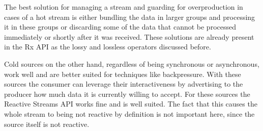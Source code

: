 The best solution for managing a stream and guarding for overproduction in cases of a hot stream is either bundling the data in larger groups and processing it in these groups or discarding some of the data that cannot be processed immediately or shortly after it was received. These solutions are already present in the Rx API as the lossy and lossless operators discussed before.

Cold sources on the other hand, regardless of being synchronous or asynchronous, work well and are better suited for techniques like backpressure. With these sources the consumer can leverage their interactiveness by advertising to the producer how much data it is currently willing to accept. For these sources the Reactive Streams API works fine and is well suited. The fact that this causes the whole stream to being not reactive by definition is not important here, since the source itself is not reactive.